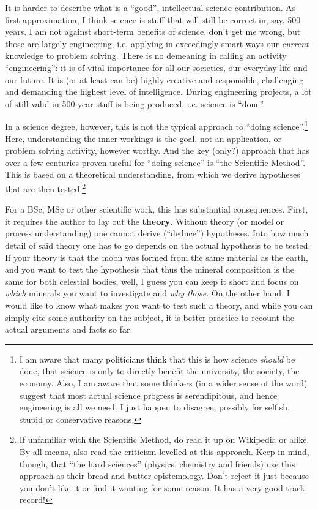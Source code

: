 It is harder to describe what is a ``good'', intellectual science contribution. As first approximation, I think science is stuff that will still be correct in, say, 500 years. I am not against short-term benefits of science, don't get me wrong, but those are largely engineering, i.e. applying in exceedingly smart ways our \emph{current} knowledge to problem solving. There is no demeaning in calling an activity ``engineering'': it is of vital importance for all our societies, our everyday life and our future. It is (or at least can be) highly creative and responsible, challenging and demanding the highest level of intelligence. During engineering projects, a lot of still-valid-in-500-year-stuff is being produced, i.e. science is ``done''. 

In a science degree, however, this is not the typical approach to ``doing science''.\footnote{I am aware that many politicians think that this is how science \emph{should} be done, that science is only to directly benefit the university, the society, the economy. Also, I am aware that some thinkers (in a wider sense of the word) suggest that most actual science progress is serendipitous, and hence engineering is all we need. I just happen to disagree, possibly for selfish, stupid or conservative reasons.} 
Here, understanding the inner workings is the goal, not an application, or problem solving activity, however worthy. And the key (only?) approach that has over a few centuries proven useful for ``doing science'' is ``the Scientific Method''. This is based on a theoretical understanding, from which we derive hypotheses that are then tested.\footnote{If unfamiliar with the Scientific Method, do read it up on Wikipedia or alike. By all means, also read the criticism levelled at this approach. Keep in mind, though, that ``the hard sciences'' (physics, chemistry and friends) use this approach as their bread-and-butter epistemology. Don't reject it just because you don't like it or find it wanting for some reason. It has a very good track record!}

For a BSc, MSc or other scientific work, this has substantial consequences. First, it requires the author to lay out the \textbf{theory}. Without theory (or model or process understanding) one cannot derive (``deduce'') hypotheses. Into how much detail of said theory one has to go depends on the actual hypothesis to be tested. If your theory is that the moon was formed from the same material as the earth, and you want to test the hypothesis that thus the mineral composition is the same for both celestial bodies, well, I guess you can keep it short and focus on \emph{which} minerals you want to investigate and \emph{why those}. On the other hand, I would like to know what makes you want to test such a theory, and while you can simply cite some authority on the subject, it is better practice to recount the actual arguments and facts so far.

